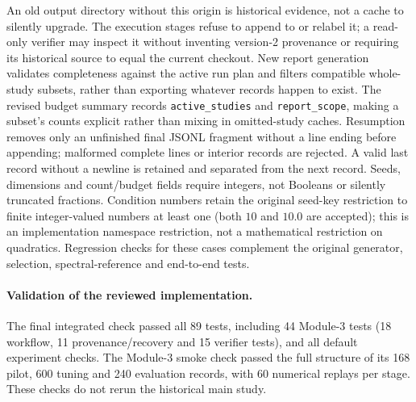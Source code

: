 \documentclass[11pt,a4paper]{article}
\newcommand{\code}[1]{\texttt{#1}}
\begin{document}
An old output directory without this origin is historical evidence, not a
cache to silently upgrade. The execution stages refuse to append to or
relabel it; a read-only verifier may inspect it without inventing version-2
provenance or requiring its historical source to equal the current checkout.
New report generation validates completeness against the active
run plan and filters compatible whole-study subsets, rather than exporting
whatever records happen to exist. The revised budget summary records
\code{active\_studies} and \code{report\_scope}, making a subset's counts
explicit rather than mixing in omitted-study caches.
Resumption removes only an unfinished final
JSONL fragment without a line ending before appending; malformed complete
lines or interior records are rejected. A valid last record without a newline
is retained and separated from the next record.
Seeds, dimensions and count/budget fields require integers, not Booleans or
silently truncated fractions. Condition numbers retain the original seed-key
restriction to finite integer-valued numbers at least one (both $10$ and
$10.0$ are accepted); this is an implementation namespace restriction, not a
mathematical restriction on quadratics. Regression checks for these cases complement
the original generator, selection, spectral-reference and end-to-end tests.

\paragraph{Validation of the reviewed implementation.} The final integrated
check passed all 89 tests, including 44 Module-3 tests (18 workflow,
11 provenance/recovery and 15 verifier tests), and all default experiment
checks. The Module-3 smoke check passed the full structure of its 168 pilot,
600 tuning and 240 evaluation records, with 60 numerical replays per stage.
These checks do not rerun the historical main study.
\end{document}

